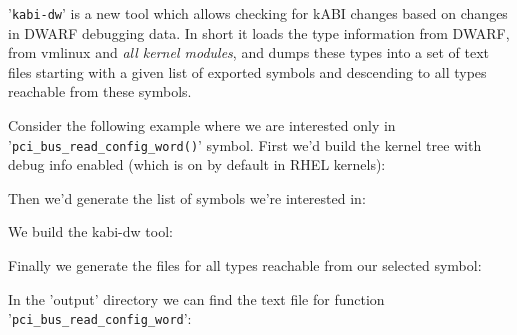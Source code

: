 \documentclass[10pt,oneside,english]{book}
\begin{document}
'\texttt{kabi-dw}' is a new tool which allows checking for kABI changes
based on changes in DWARF debugging data. In short it loads the type
information from DWARF, from vmlinux and \emph{all kernel modules},
and dumps these types into a set of text files starting with a given
list of exported symbols and descending to all types reachable from
these symbols.

Consider the following example where we are interested only in '\texttt{pci\_bus\_read\_config\_word()}'
symbol. First we'd build the kernel tree with debug info enabled (which
is on by default in RHEL kernels):


Then we'd generate the list of symbols we're interested in:


We build the kabi-dw tool:


Finally we generate the files for all types reachable from our selected
symbol:


In the 'output' directory we can find the text file for function '\texttt{pci\_bus\_read\_config\_word}':

\end{document}
